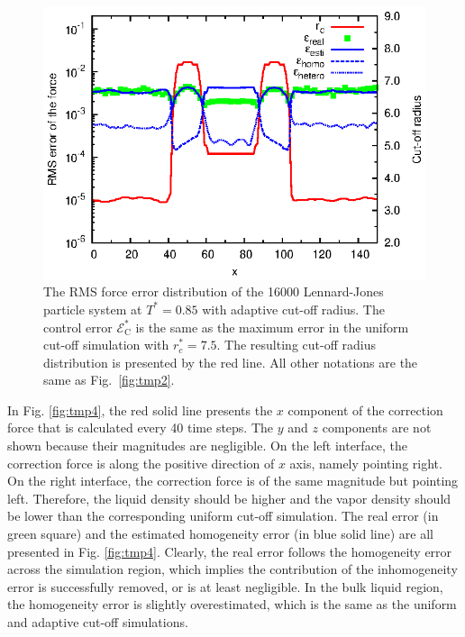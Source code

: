 \documentclass[preprint]{revtex4}
\begin{document}
\begin{figure}
  \centering
  \includegraphics[]{figs/rcut.and.error.eps}
  \caption{ The RMS force error distribution of the 16000
    Lennard-Jones particle system at $T^\ast=0.85$ with adaptive
    cut-off radius. The control error $\mathcal E^\ast_{\textrm{C}}$
    is the same as the maximum error in the uniform cut-off simulation
    with $r_c^\ast=7.5$.  The resulting cut-off radius distribution is
    presented by the red line. All other notations are the same as
    Fig.~\ref{fig:tmp2}.}
  \label{fig:tmp3}
\end{figure}


In Fig. \ref{fig:tmp4}, the red solid line presents the $x$ component
of the 
correction force that is calculated every 40 time steps. The $y$ and
$z$ components are not shown because their magnitudes are negligible.
On the left interface, the correction force is along the positive
direction of $x$ axis, namely pointing right.  On the right interface,
the correction force is of the same magnitude but pointing
left. Therefore, the liquid density should be higher and the vapor
density should be lower than the corresponding uniform cut-off
simulation.  The real error (in green square) and the estimated
homogeneity error (in blue solid line) are all presented in
Fig. \ref{fig:tmp4}.  Clearly, the real error follows the homogeneity
error across the simulation region, which implies the contribution of
the inhomogeneity error is successfully removed, or is at least
negligible. In the bulk liquid region, the homogeneity error is
slightly overestimated, which is the same as the uniform and adaptive
cut-off simulations.
\end{document}
